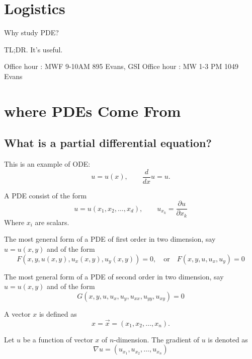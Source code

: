 \section*{Logistics}
\begin{question}
	Why study PDE?
\end{question}
\begin{answer}
	TL;DR. It's useful.
\end{answer}
\begin{note}
	Office hour : MWF 9-10AM 895 Evans, GSI Office hour : MW 1-3 PM 1049 Evans
\end{note}
\section{where PDEs Come From}
\subsection{What is a partial differential equation?}
\begin{example}
	This is an example of ODE:
	\[ u  = u(x), \qquad \frac{d}{dx} u = u.\]
\end{example}
\begin{example}
	A PDE consist of the form
	\[ u = u(x_1, x_2, \ldots, x_d), \qquad u_{x_k} = \frac{\partial u}{\partial x_k}\]
	Where $x_i$ are scalars.
\end{example}
\begin{example}
	The most general form of a PDE of first order in two dimension, say $u = u(x,y)$ and of the form
	\[ F(x,y,u(x,y), u_x(x,y),u_y(x,y)) = 0 , \quad \mathrm{ or } \quad F(x,y,u, u_x, u_y) = 0\]

\end{example}
\begin{example}
	The most general form of a PDE of second order in two dimension, say $u = u(x,y)$ and of the form
	\[ G(x,y,u, u_x, u_y, u_{xx}, u_{yy}, u_{xy}) = 0 \]
\end{example}
\begin{definition}
	A vector $x$ is defined as
	\[ x = \vec x = (x_1, x_2, \ldots, x_n).\]
\end{definition}
\begin{definition}
	Let $u$ be a function of vector $x$ of $n$-dimension. The gradient of $u$ is denoted as
	\[ \nabla u = (u_{x_1}, u_{x_2}, \ldots, u_{x_n})\]
\end{definition}
